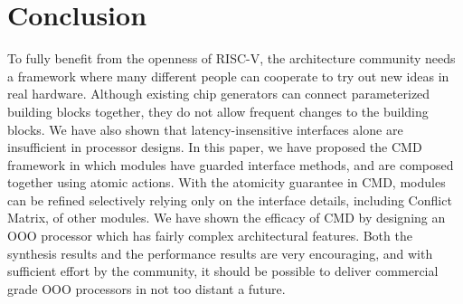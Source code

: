 \documentclass[conference]{IEEEtran}
\begin{document}

\section{Conclusion}\label{sec:conclude}
To fully benefit from the openness of RISC-V, the architecture community needs a framework where many different people can cooperate to try out new ideas in real hardware.
Although existing chip generators can connect parameterized building blocks together,  they do not allow frequent changes to the building blocks.
We have also shown that latency-insensitive interfaces alone are insufficient in processor designs.
In this paper, we have proposed the CMD framework in which modules have guarded interface methods, and are composed together using atomic actions. 
With the atomicity guarantee in CMD, modules can be refined selectively relying only on the interface details, including Conflict Matrix, of other modules.
We have shown the efficacy of CMD by designing an OOO processor which has fairly complex architectural features.
Both the synthesis results and the performance results are very encouraging, and with sufficient effort by the community, it should be possible to deliver commercial grade OOO processors in not too distant a future.
\end{document}
